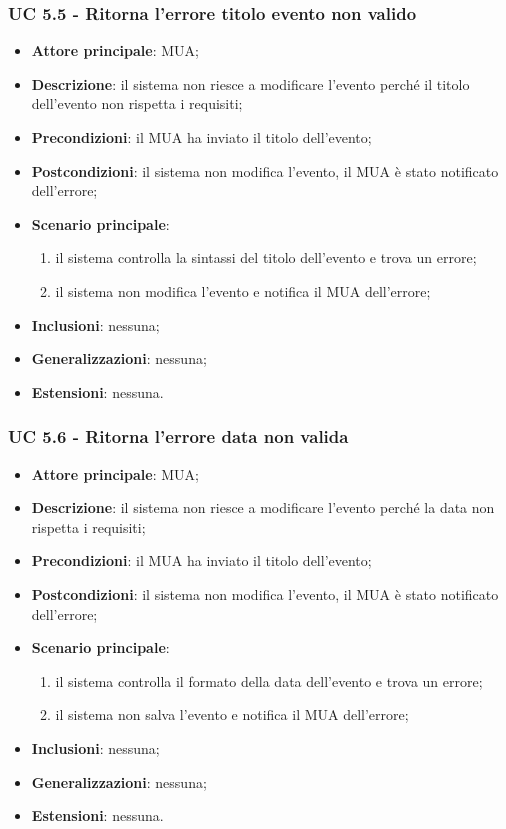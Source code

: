     \subsubsection{UC 5.5 - Ritorna l'errore titolo evento non valido} \label{sec:UC5.5}
    \begin{itemize}
        \item \textbf{Attore principale}: MUA;
        \item \textbf{Descrizione}: il sistema non riesce a modificare l'evento perché il titolo dell'evento non rispetta i requisiti;
        \item \textbf{Precondizioni}: il MUA ha inviato il titolo dell'evento;
        \item \textbf{Postcondizioni}: il sistema non modifica l'evento, il MUA è stato notificato dell'errore;
        \item \textbf{Scenario principale}:
            \begin{enumerate}
                \item il sistema controlla la sintassi del titolo dell'evento e trova un errore;
                \item il sistema non modifica l'evento e notifica il MUA dell'errore;
            \end{enumerate}
        \item \textbf{Inclusioni}: nessuna;
        \item \textbf{Generalizzazioni}: nessuna;
        \item \textbf{Estensioni}: nessuna.
    \end{itemize}


    \subsubsection{UC 5.6 - Ritorna l'errore data non valida} \label{sec:UC5.6}
    \begin{itemize}
        \item \textbf{Attore principale}: MUA;
        \item \textbf{Descrizione}: il sistema non riesce a modificare l'evento perché la data non rispetta i requisiti;
        \item \textbf{Precondizioni}: il MUA ha inviato il titolo dell'evento;
        \item \textbf{Postcondizioni}: il sistema non modifica l'evento, il MUA è stato notificato dell'errore;
        \item \textbf{Scenario principale}:
            \begin{enumerate}
                \item il sistema controlla il formato della data dell'evento e trova un errore;
                \item il sistema non salva l'evento e notifica il MUA dell'errore;
            \end{enumerate}
        \item \textbf{Inclusioni}: nessuna;
        \item \textbf{Generalizzazioni}: nessuna;
        \item \textbf{Estensioni}: nessuna.
    \end{itemize}

